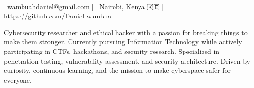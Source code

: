 \documentclass[]{resume-format}
\begin{document}
%


\setlength\fboxsep{10pt}%

\begingroup

\noindent
\colorbox{headerbg}{
  \parbox{\dimexpr\textwidth-2\fboxsep}{
    \color{white} %
    \begin{center} %
      \\[2mm] %
      \faEnvelope~\href{mailto:wambuahdaniel@gmail.com}wambuahdaniel@gmail.com %
      \quad|\quad %
      \faMapMarker~Nairobi, Kenya 🇰🇪 %
      \quad|\quad %
      \faLink~\href{ https://github.com/Daniel-wambua }{ https://github.com/Daniel-wambua } %
    \end{center} %
  }
}
\endgroup
\vspace{2mm} %



\begin{cvpersonalstatement}
  \item { Cybersecurity researcher and ethical hacker with a passion for breaking things to make them stronger.
Currently pursuing Information Technology while actively participating in CTFs, hackathons, and security research.
Specialized in penetration testing, vulnerability assessment, and security architecture.
Driven by curiosity, continuous learning, and the mission to make cyberspace safer for everyone.
 }
\end{cvpersonalstatement}


\end{document}

